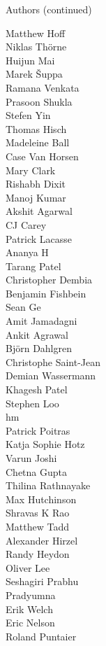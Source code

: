 \begin{frame}{Authors (continued)}
\begin{multicols}{5}
\tiny
Matthew Hoff\\
Niklas Thörne\\
Huijun Mai\\
Marek Šuppa\\
Ramana Venkata\\
Prasoon Shukla\\
Stefen Yin\\
Thomas Hisch\\
Madeleine Ball\\
Case Van Horsen\\
Mary Clark\\
Rishabh Dixit\\
Manoj Kumar\\
Akshit Agarwal\\
CJ Carey\\
Patrick Lacasse\\
Ananya H\\
Tarang Patel\\
Christopher Dembia\\
Benjamin Fishbein\\
Sean Ge\\
Amit Jamadagni\\
Ankit Agrawal\\
Björn Dahlgren\\
Christophe Saint-Jean\\
Demian Wassermann\\
Khagesh Patel\\
Stephen Loo\\
hm\\
Patrick Poitras\\
Katja Sophie Hotz\\
Varun Joshi\\
Chetna Gupta\\
Thilina Rathnayake\\
Max Hutchinson\\
Shravas K Rao\\
Matthew Tadd\\
Alexander Hirzel\\
Randy Heydon\\
Oliver Lee\\
Seshagiri Prabhu\\
Pradyumna\\
Erik Welch\\
Eric Nelson\\
Roland Puntaier\\

\end{multicols}
\end{frame}
